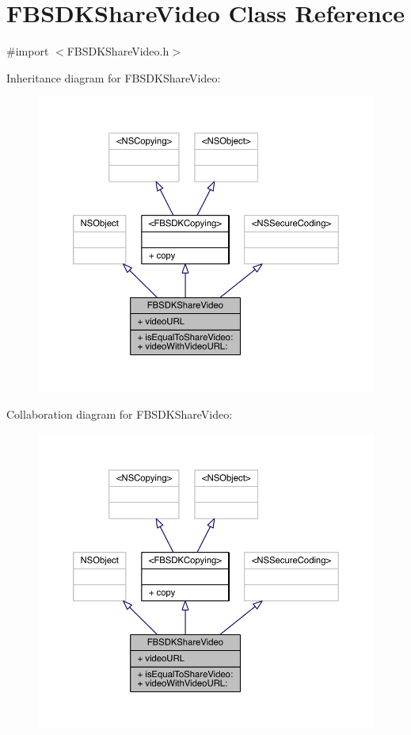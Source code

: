 \hypertarget{interface_f_b_s_d_k_share_video}{\section{F\-B\-S\-D\-K\-Share\-Video Class Reference}
\label{interface_f_b_s_d_k_share_video}
}


{\ttfamily \#import $<$F\-B\-S\-D\-K\-Share\-Video.\-h$>$}



Inheritance diagram for F\-B\-S\-D\-K\-Share\-Video\-:
\nopagebreak
\begin{figure}[H]
\begin{center}
\leavevmode
\includegraphics[width=350pt]{interface_f_b_s_d_k_share_video__inherit__graph}
\end{center}
\end{figure}


Collaboration diagram for F\-B\-S\-D\-K\-Share\-Video\-:
\nopagebreak
\begin{figure}[H]
\begin{center}
\leavevmode
\includegraphics[width=350pt]{interface_f_b_s_d_k_share_video__coll__graph}
\end{center}
\end{figure}
